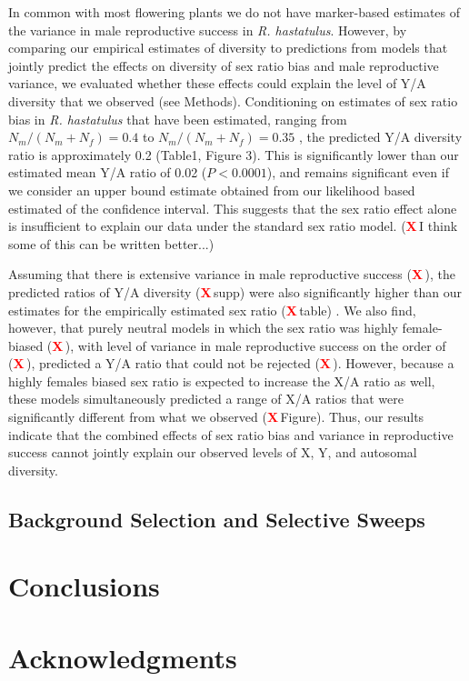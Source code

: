 \documentclass[9pt,twocolumn,twoside]{gsajnl}
\newcommand{\X}{\textcolor{red}{\bf X\,}}
\begin{document}
 In common with most flowering plants we do not have marker-based estimates of the variance in male reproductive success in \textit{R. hastatulus}. However, by comparing our empirical estimates of diversity to predictions from models that jointly predict the effects on diversity of sex ratio bias and male reproductive variance, we evaluated whether these effects could explain the level of Y/A diversity that we observed (see Methods). Conditioning on estimates of sex ratio bias in \textit{R. hastatulus} that have been estimated, ranging from $N_{m}/(N_{m}+N_{f})=0.4$ to $N_{m}/(N_{m}+N_{f})=0.35$ \citep{pickup2013influence}, the predicted Y/A diversity ratio  is approximately 0.2 (Table1, Figure 3). This is significantly lower than our estimated mean Y/A ratio of 0.02 ($\textit{P}<0.0001$), and remains significant even if we consider an upper bound estimate obtained from our likelihood based estimated of the confidence interval. This suggests that the sex ratio effect alone is insufficient to explain our data under the standard sex ratio model. (\X I think some of this can be written better...)
 
Assuming that there is extensive variance in male reproductive success (\X), the predicted ratios of Y/A diversity (\X supp) were also significantly higher than our estimates for the empirically estimated sex ratio (\X table) . We also find, however, that purely neutral models in which the sex ratio was highly female-biased (\X), with level of variance in male reproductive success on the order of (\X), predicted a Y/A ratio that could not be rejected (\X). However, because a highly females biased sex ratio is expected to increase the X/A ratio as well, these models simultaneously predicted a range of X/A ratios that were significantly different from what we observed (\X Figure). Thus, our results indicate that the combined effects of sex ratio bias and variance in reproductive success cannot jointly explain our observed levels of X, Y, and autosomal diversity.
 
\subsection*{Background Selection and Selective Sweeps}

\section*{Conclusions}

\section*{Acknowledgments}



\end{document}
